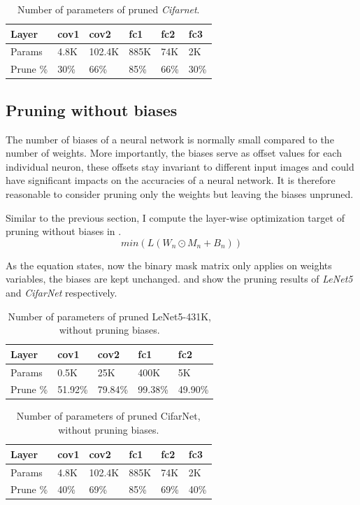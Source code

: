 \documentclass[a4paper,12pt]{report}
\begin{document}
\begin{table}[!h]
\centering
\begin{tabular}{|l|l|l|l|l|l|}
\hline
Layer			&cov1	&cov2		&fc1		&fc2		&fc3		\\ \hline
Params		& 4.8K		&102.4K	&885K	&74K		&2K 	\\
\hline
Prune \%	& 30\%		&66\%	&85\%	&66\%	&30\%	 \\
\hline
\end{tabular}
\caption{Number of parameters of pruned \textit{Cifarnet}.}
\label{tab:CifarNetPrune}
\end{table}


\subsection{Pruning without biases}
The number of biases of a neural network is normally small compared to
the number of weights.
More importantly, the biases serve as offset values for each individual neuron,
these offsets stay invariant to different input images and could have significant
impacts on the accuracies of a neural network.
It is therefore reasonable to consider pruning only the
weights but leaving the biases unpruned.

Similar to the previous section, I compute the layer-wise optimization target
of pruning without biases in .
\begin{equation}
  min(L(W_n \odot M_n + B_n))
  \label{equ:lossmin2}
\end{equation}

As the equation states, now the binary mask matrix only applies on weights variables,
the biases are kept unchanged.
 and  show the pruning results
of \textit{LeNet5} and \textit{CifarNet} respectively.

\begin{table}[!h]
\centering
\begin{tabular}{|l|l|l|l|l|}
\hline
Layer			&cov1	&cov2	&fc1	&fc2 		\\ \hline
Params		& 0.5K		&25K	&400K	&5K		\\
\hline
Prune \%	& 51.92\%		&79.84\%	&99.38\%	&49.90\%	 \\
\hline
\end{tabular}
\caption{Number of parameters of pruned LeNet5-431K, without pruning biases.}
\label{tab:LeNetPrune2}
\end{table}

\begin{table}[!h]
\centering
\begin{tabular}{|l|l|l|l|l|l|}
\hline
Layer			&cov1	&cov2		&fc1		&fc2		&fc3		\\ \hline
Params		& 4.8K		&102.4K	&885K	&74K		&2K 	\\
\hline
Prune \%	& 40\%		&69\%	&85\%	&69\%	&40\% \\
\hline
\end{tabular}
\caption{Number of parameters of pruned CifarNet, without pruning biases.}
\label{tab:CifarNetPrune2}
\end{table}
\end{document}
